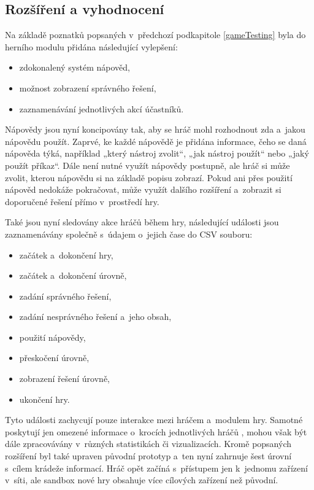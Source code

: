 \documentclass[
  digital, %
  oneside, %
  table,   %
  nolof,     %
  nolot,     %
  nocover
]{fithesis3}
\begin{document}
\subsection{Rozšíření a vyhodnocení} \label{gameExtensions}
Na základě poznatků popsaných v~předchozí podkapitole \ref{gameTesting} byla do herního modulu přidána následující vylepšení:
\begin{itemize}
  \item zdokonalený systém nápověd,
  \item možnost zobrazení správného řešení,
  \item zaznamenávání jednotlivých akcí účastníků.
\end{itemize}
Nápovědy jsou nyní koncipovány tak, aby se hráč mohl rozhodnout zda a~jakou nápovědu použít. Zaprvé, ke každé nápovědě je přidána informace, čeho se daná nápověda týká, například „který nástroj zvolit“, „jak nástroj použít“ nebo „jaký použít příkaz“. Dále není nutné využít nápovědy postupně, ale hráč si může zvolit, kterou nápovědu si na základě popisu zobrazí. Pokud ani přes použití nápověd nedokáže pokračovat, může využít dalšího rozšíření a~zobrazit si doporučené řešení přímo v~prostředí hry. \cite{ctfDesign}\par
Také jsou nyní sledovány akce hráčů během hry, následující události jsou zaznamenávány společně s~údajem o~jejich čase do CSV souboru:
\begin{itemize}
  \item začátek a~dokončení hry,
  \item začátek a~dokončení úrovně,
  \item zadání správného řešení,
  \item zadání nesprávného řešení a~jeho obsah,
  \item použití nápovědy,
  \item přeskočení úrovně,
  \item zobrazení řešení úrovně,
  \item ukončení hry.
\end{itemize}
Tyto události zachycují pouze interakce mezi hráčem a~modulem hry. Samotné poskytují jen omezené informace o~krocích jednotlivých hráčů \cite{ctfDesign}, mohou však být dále zpracovávány v~různých statistikách či vizualizacích.
Kromě popsaných rozšíření byl také upraven původní prototyp a~ten nyní zahrnuje šest úrovní s~cílem krádeže informací. Hráč opět začíná s~přístupem jen k~jednomu zařízení v~síti, ale sandbox nové hry obsahuje více cílových zařízení než původní.\par
\end{document}
